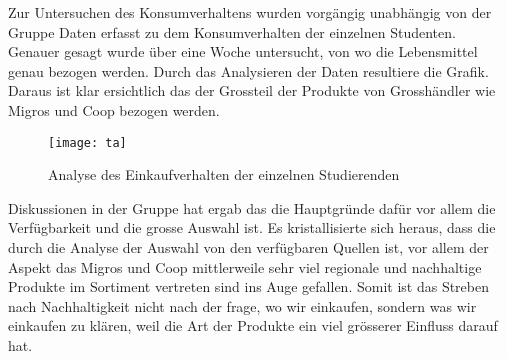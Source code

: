 Zur Untersuchen des Konsumverhaltens wurden vorgängig unabhängig von der Gruppe Daten erfasst zu dem Konsumverhalten der einzelnen Studenten. Genauer gesagt wurde über eine Woche untersucht, von wo die Lebensmittel genau bezogen werden. Durch das Analysieren der Daten resultiere die Grafik. Daraus ist klar ersichtlich das der Grossteil der Produkte von Grosshändler wie Migros und Coop bezogen werden.
 \begin{figure}[H]
	\centering
	\texttt{[image: ta]}
	\caption{Analyse des Einkaufverhalten der einzelnen Studierenden}
\end{figure}
Diskussionen in der Gruppe hat ergab das die Hauptgründe dafür vor allem die Verfügbarkeit und die grosse Auswahl ist. Es kristallisierte sich heraus, dass die durch die Analyse der Auswahl von den verfügbaren Quellen ist, vor allem der Aspekt das Migros und Coop mittlerweile sehr viel regionale und nachhaltige Produkte im Sortiment vertreten sind ins Auge gefallen. Somit ist  das Streben nach Nachhaltigkeit nicht nach der frage, wo wir einkaufen, sondern was wir einkaufen zu klären, weil die Art der Produkte ein viel grösserer Einfluss darauf hat.